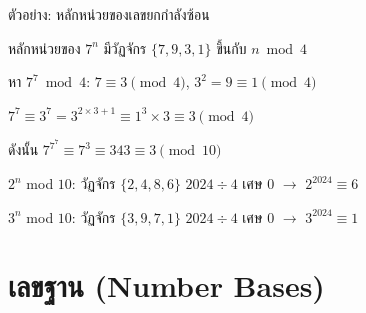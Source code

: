 \documentclass[11pt, aspectratio=169]{beamer}
\begin{document}
\begin{frame}{ตัวอย่าง: หลักหน่วยของเลขยกกำลังซ้อน}
  \begin{exambox}
    หลักหน่วยของ $7^n$ มีวัฏจักร $\{7, 9, 3, 1\}$ ขึ้นกับ $n \bmod 4$

    หา $7^7 \bmod 4$: $7 \equiv 3 \pmod{4}$,
    $3^2 = 9 \equiv 1 \pmod{4}$

    $7^7 \equiv 3^7 = 3^{2\times 3 + 1} \equiv 1^3 \times 3 \equiv 3 \pmod{4}$

    ดังนั้น $7^{7^7} \equiv 7^3 \equiv 343 \equiv 3 \pmod{10}$

  \end{exambox}

  \begin{exambox}
    $2^n$ mod $10$: วัฏจักร $\{2,4,8,6\}$ \quad $2024 \div 4$ เศษ $0$ $\rightarrow$ $2^{2024} \equiv 6$

    $3^n$ mod $10$: วัฏจักร $\{3,9,7,1\}$ \quad $2024 \div 4$ เศษ $0$ $\rightarrow$ $3^{2024} \equiv 1$

  \end{exambox}
\end{frame}

\section{เลขฐาน (Number Bases)}
\end{document}
